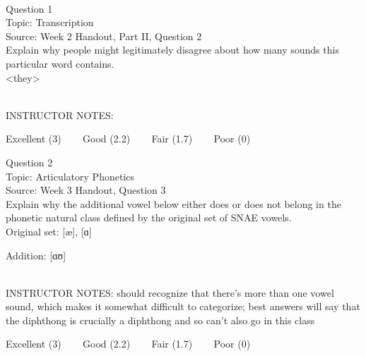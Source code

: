 \documentclass[12pt]{article}
\begin{document}
\begin{center}
\textbf{{\color{red}{\HUGE END OF EXAM}}}\\

\end{center}
\newpage

\begin{center}
\textbf{{\color{blue}{\HUGE START OF EXAM\\}}}

\textbf{{\color{blue}{\HUGE Student ID: 43119\\}}}

\textbf{{\color{blue}{\HUGE \\}}}

\end{center}
\newpage

{\large Question 1}\\

Topic: Transcription\\
Source: Week 2 Handout, Part II, Question 2\\

Explain why people might legitimately disagree about how many sounds this particular word contains.\\

<they>


~\\
INSTRUCTOR NOTES: 


\vfill
Excellent (3) ~~~ Good (2.2) ~~~ Fair (1.7) ~~~ Poor (0)
\newpage

{\large Question 2}\\

Topic: Articulatory Phonetics\\
Source: Week 3 Handout, Question 3\\

Explain why the additional vowel below either does or does not belong in the phonetic natural class defined by the original set of SNAE vowels.\\

Original set: {[æ]}, {[ɑ]}

Addition: {[ɑʊ]}


~\\
INSTRUCTOR NOTES: should recognize that there's more than one vowel sound, which makes it somewhat difficult to categorize; best answers will say that the diphthong is crucially a diphthong and so can't also go in this class


\vfill
Excellent (3) ~~~ Good (2.2) ~~~ Fair (1.7) ~~~ Poor (0)
\newpage
\end{document}
